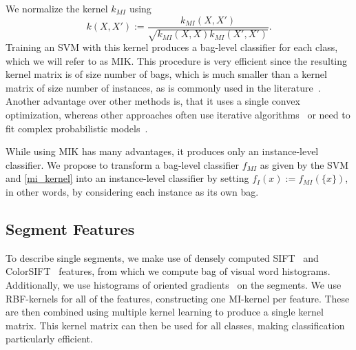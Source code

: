 We normalize the kernel $k_{MI}$ \citep{gaertner2002multi} using
\begin{equation}
k(X,X') := \frac{k_{MI}(X,X')}{\sqrt{k_{MI}(X,X)k_{MI}(X',X')}}.
\end{equation}
Training an SVM with this kernel produces a bag-level classifier for each class, which we will refer to as MIK.
This procedure is very efficient since the resulting kernel matrix is of size
number of bags, which is much smaller than a kernel matrix of size number of
instances, as is commonly used in the
literature~\citep{andrews2003support,nguyen2010new,zhang2008m3miml}.  Another
advantage over other methods is, that it uses a single convex optimization,
whereas other approaches often use iterative algorithms~\citep{andrews2003support} or need to fit complex
probabilistic models~\citep{zha2008joint}.

While using MIK has many advantages, it produces only an instance-level
classifier. We propose to transform a bag-level classifier $f_{MI}$ as given by
the SVM and \eqref{mi_kernel} into an instance-level classifier by setting
$f_{I}(x):=f_{MI}(\{x\})$, in other words, by considering each instance as its own
bag. 


\subsection{Segment Features}
To describe single segments, we make use of densely computed SIFT~\citep{lowe2004distinctive} and ColorSIFT~\citep{van2009evaluating} features, from which
we compute bag of visual word histograms. Additionally, we use histograms of oriented gradients~\citep{dalal2005histograms} on the segments.
We use RBF-kernels for all of the features,
constructing one MI-kernel per feature. These are then combined using multiple kernel
learning to produce a single kernel matrix. This kernel matrix can then be used for all classes,
making classification particularly efficient.

